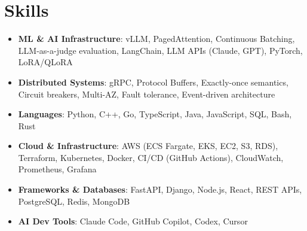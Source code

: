 \documentclass[letterpaper,11pt]{article}
\newcommand{\resumeSubHeadingListStart}{\begin{itemize}[leftmargin=0.15in, label={}]}
\newcommand{\resumeSubHeadingListEnd}{\end{itemize}}
\newcommand{\resumeSkillHeading}[2]{%
  \item\small{\textbf{#1}: #2 \vspace{-9pt}}%
}
\begin{document}
\section{Skills}
  \resumeSubHeadingListStart
    \resumeSkillHeading{ML \& AI Infrastructure}{vLLM, PagedAttention, Continuous Batching, LLM-as-a-judge evaluation, LangChain, LLM APIs (Claude, GPT), PyTorch, LoRA/QLoRA}
    \resumeSkillHeading{Distributed Systems}{gRPC, Protocol Buffers, Exactly-once semantics, Circuit breakers, Multi-AZ, Fault tolerance, Event-driven architecture}
    \resumeSkillHeading{Languages}{Python, C++, Go, TypeScript, Java, JavaScript, SQL, Bash, Rust}
    \resumeSkillHeading{Cloud \& Infrastructure}{AWS (ECS Fargate, EKS, EC2, S3, RDS), Terraform, Kubernetes, Docker, CI/CD (GitHub Actions), CloudWatch, Prometheus, Grafana}
    \resumeSkillHeading{Frameworks \& Databases}{FastAPI, Django, Node.js, React, REST APIs, PostgreSQL, Redis, MongoDB}
    \resumeSkillHeading{AI Dev Tools}{Claude Code, GitHub Copilot, Codex, Cursor}
  \resumeSubHeadingListEnd
\end{document}
